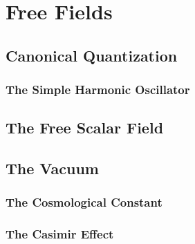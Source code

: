 \chapter{Free Fields} %
\label{cha:Free Fields}
\section{Canonical Quantization} %
\label{sec:Canonical Quantization}

\subsection{The Simple Harmonic Oscillator} %
\label{sub:The Simple Harmonic Oscillator}


\section{The Free Scalar Field} %
\label{sec:The Free Scalar Field}


\section{The Vacuum} %
\label{sec:The Vacuum}

\subsection{The Cosmological Constant} %
\label{sub:The Cosmological Constant}

\subsection{The Casimir Effect} %
\label{sub:The Casimir Effect}

